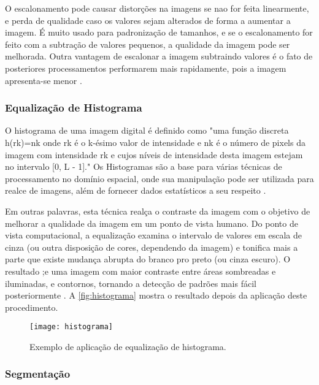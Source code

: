 O escalonamento pode causar distorções na imagens se nao for feita linearmente, e perda de qualidade caso os valores sejam alterados de forma a aumentar a imagem. É muito usado para padronização de tamanhos, e se o escalonamento for feito com a subtração de valores pequenos, a qualidade da imagem pode ser melhorada. Outra vantagem de escalonar a imagem subtraindo valores é o fato de posteriores processamentos performarem mais rapidamente, pois a imagem apresenta-se menor \cite{drmathew_java_programming}. 


\subsubsection{Equalização de Histograma}\label{subsubsec:equalizacao}

O histograma de uma imagem digital é definido como "uma função discreta h(rk)=nk onde  rk é o k-ésimo valor de intensidade e nk  é o número de pixels da imagem com intensidade rk e cujos níveis de intensidade desta imagem estejam no intervalo [0, L - 1]." Os Histogramas são a base para várias técnicas de processamento no domínio espacial, onde sua manipulação pode ser utilizada para realce de imagens, além de fornecer dados estatísticos a seu respeito \cite{gonzalez_woods}.

Em outras palavras, esta técnica realça o contraste da imagem com o objetivo de melhorar a qualidade da imagem em um ponto de vista humano. Do ponto de vista computacional, a equalização examina o intervalo de valores em escala de cinza (ou outra disposição de cores, dependendo da imagem) e tonifica mais a parte que existe mudança abrupta do branco pro preto (ou cinza escuro). O resultado ;e uma imagem com maior contraste entre áreas sombreadas e iluminadas, e contornos, tornando a detecção de padrões mais fácil posteriormente \cite{drmathew_java_programming}. A \autoref{fig:histograma} mostra o resultado depois da aplicação deste procedimento.

\begin{figure}[h]
	\centering
	\texttt{[image: histograma]}
	\caption{Exemplo de aplicação de equalização de  histograma.}
	\label{fig:histograma}
\end{figure}



\subsubsection{Segmentação}\label{subsubsec:segmentacao}

